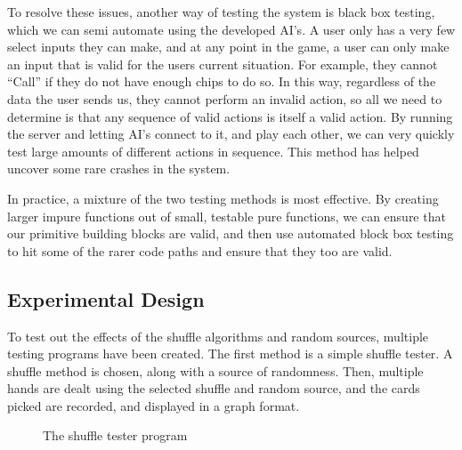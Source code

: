 To resolve these issues, another way of testing the system is black box
testing, which we can semi automate using the developed AI's. A user only
has a very few select inputs they can make, and at any point in the game,
a user can only make an input that is valid for the users current situation.
For example, they cannot ``Call'' if they do not have enough chips to do so.
In this way, regardless of the data the user sends us, they cannot perform
an invalid action, so all we need to determine is that any sequence of valid
actions is itself a valid action. By running the server and letting AI's
connect to it, and play each other, we can very quickly test large amounts
of different actions in sequence. This method has helped uncover some rare
crashes in the system.

In practice, a mixture of the two testing methods is most effective. By
creating larger impure functions out of small, testable pure functions, we
can ensure that our primitive building blocks are valid, and then use automated
block box testing to hit some of the rarer code paths and ensure that they
too are valid.

\subsection{Experimental Design}
To test out the effects of the shuffle algorithms and random sources, multiple
testing programs have been created. The first method is a simple shuffle
tester. A shuffle method is chosen, along with a source of randomness. Then,
multiple hands are dealt using the selected shuffle and random source, and
the cards picked are recorded, and displayed in a graph format.

\begin{figure}[h]
    \caption{The shuffle tester program}%
    \label{fig:shuffletester}
\end{figure}

